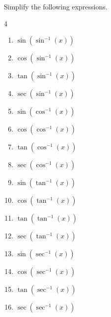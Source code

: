 \documentclass[../main.tex]{subfiles}
\begin{document}
\begin{exercise} \label{ex:trig-f-finverse}
  Simplify the following expressions.

  \begin{multicols}{4}
    \begin{enumerate}
      \item \(\sin(\sin^{-1}(x))\)
      \item \(\cos(\sin^{-1}(x))\)
      \item \(\tan(\sin^{-1}(x))\)
      \item \(\sec(\sin^{-1}(x))\)
      \item \(\sin(\cos^{-1}(x))\)
      \item \(\cos(\cos^{-1}(x))\)
      \item \(\tan(\cos^{-1}(x))\)
      \item \(\sec(\cos^{-1}(x))\)
      \item \(\sin(\tan^{-1}(x))\)
      \item \(\cos(\tan^{-1}(x))\)
      \item \(\tan(\tan^{-1}(x))\)
      \item \(\sec(\tan^{-1}(x))\)
      \item \(\sin(\sec^{-1}(x))\)
      \item \(\cos(\sec^{-1}(x))\)
      \item \(\tan(\sec^{-1}(x))\)
      \item \(\sec(\sec^{-1}(x))\)
    \end{enumerate}
  \end{multicols}

\end{exercise}
\clearpage
\end{document}
